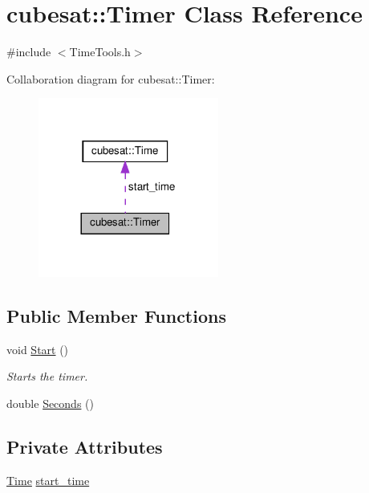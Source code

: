 \hypertarget{classcubesat_1_1Timer}{}\section{cubesat\+:\+:Timer Class Reference}
\label{classcubesat_1_1Timer}


{\ttfamily \#include $<$Time\+Tools.\+h$>$}



Collaboration diagram for cubesat\+:\+:Timer\+:
\nopagebreak
\begin{figure}[H]
\begin{center}
\leavevmode
\includegraphics[width=168pt]{classcubesat_1_1Timer__coll__graph}
\end{center}
\end{figure}
\subsection*{Public Member Functions}
\begin{DoxyCompactItemize}
\item 
void \hyperlink{classcubesat_1_1Timer_a5fe22b19f80d819e4255ca38a3781739}{Start} ()
\begin{DoxyCompactList}\small\item\em Starts the timer. \end{DoxyCompactList}\item 
double \hyperlink{classcubesat_1_1Timer_adf22bfb3a1acada570439abda1bc5741}{Seconds} ()
\end{DoxyCompactItemize}
\subsection*{Private Attributes}
\begin{DoxyCompactItemize}
\item 
\hyperlink{classcubesat_1_1Time}{Time} \hyperlink{classcubesat_1_1Timer_add769135485d41136939ec3d6ed8b1d7}{start\+\_\+time}
\end{DoxyCompactItemize}


